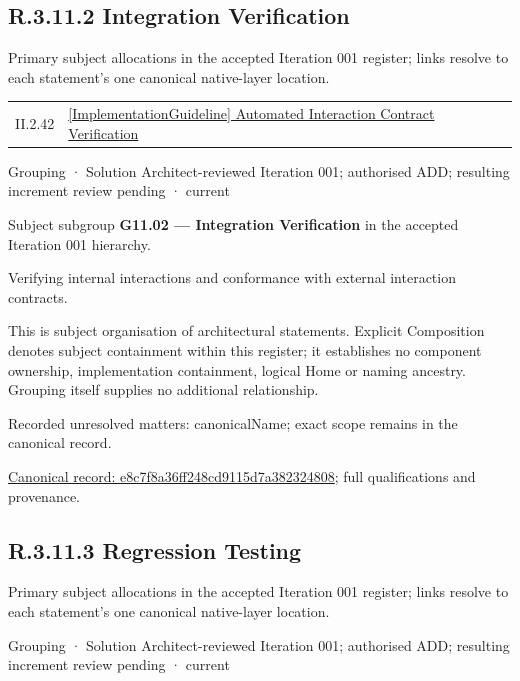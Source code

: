\subsection*{R.3.11.2 Integration Verification}
\label{navigation:R.3.11.2}

Primary subject allocations in the accepted Iteration 001 register; links resolve to each statement’s one canonical native-layer location.\par
\begin{longtable}{p{.22\linewidth}p{.73\linewidth}}
II.2.42 & \hyperref[element:a6c8cc8f5647461cb210f88ced90cc57]{[ImplementationGuideline] Automated Interaction Contract Verification} \\
\end{longtable}
\label{element:e8c7f8a36ff248cd9115d7a382324808}
{\small Grouping · Solution Architect-reviewed Iteration 001; authorised ADD; resulting increment review pending · current}\par

Subject subgroup \textbf{G11.02 — Integration Verification} in the accepted Iteration 001 hierarchy.



Verifying internal interactions and conformance with external interaction contracts.



This is subject organisation of architectural statements. Explicit Composition denotes subject containment within this register; it establishes no component ownership, implementation containment, logical Home or naming ancestry. Grouping itself supplies no additional relationship.


{\small Recorded unresolved matters: canonicalName; exact scope remains in the canonical record.}\par
{\footnotesize \href{../../../../continuum/grouping/e8c7f8a36ff248cd9115d7a382324808.md}{Canonical record: e8c7f8a36ff248cd9115d7a382324808}; full qualifications and provenance.}\par
\subsection*{R.3.11.3 Regression Testing}
\label{navigation:R.3.11.3}

Primary subject allocations in the accepted Iteration 001 register; links resolve to each statement’s one canonical native-layer location.\par
\label{element:35df8a5d8b1e495ba4cf79a5d4a47863}
{\small Grouping · Solution Architect-reviewed Iteration 001; authorised ADD; resulting increment review pending · current}\par

